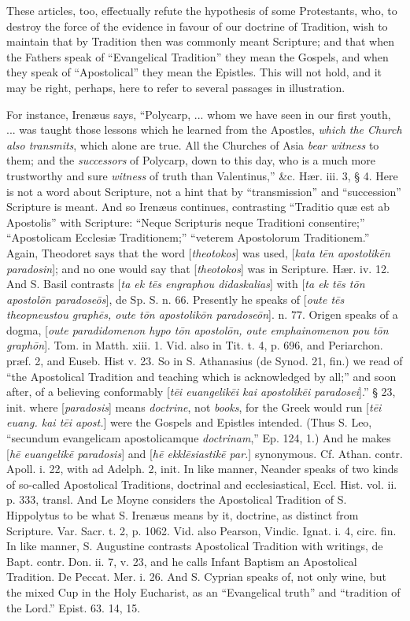 These articles, too, effectually refute the
hypothesis of some Protestants, who, to destroy the force of the
evidence in favour of our doctrine of Tradition, wish to maintain that
by Tradition then was commonly meant Scripture; and that when the
Fathers speak of ``Evangelical Tradition'' they mean the Gospels, and
when they speak of ``Apostolical'' they mean the Epistles. This will not
hold, and it may be right, perhaps, here to refer to several passages
in illustration.

For instance, Irenæus says, ``Polycarp, ... whom
we have seen in our first youth, ... was taught those lessons which he
learned from the Apostles, \emph{which the Church also transmits},
which alone are true. All the Churches of Asia \emph{bear witness} to
them; and the \emph{successors} of Polycarp, down to this day, who is
a much more trustworthy and sure \emph{witness} of truth than
Valentinus,'' \&c. Hær. iii. 3, § 4. Here is not a word about
Scripture, not a hint that by ``transmission'' and ``succession''
Scripture is meant. And so Irenæus continues, contrasting ``Traditio
quæ est ab Apostolis'' with Scripture: ``Neque Scripturis neque
Traditioni consentire;'' ``Apostolicam Ecclesiæ Traditionem;'' ``veterem
Apostolorum Traditionem.'' Again, Theodoret says that the word [\emph{theotokos}]
was used, [\emph{kata t\={e}n apostolik\={e}n paradosin}]; and
no one would say that [\emph{theotokos}] was in Scripture. Hær. iv.
12. And S. Basil contrasts [\emph{ta ek t\={e}s engraphou didaskalias}]
with [\emph{ta ek t\={e}s t\={o}n apostol\={o}n paradose\={o}s}],
de Sp. S. n. 66. Presently he speaks of [\emph{oute t\={e}s
theopneustou graph\={e}s, oute t\={o}n apostolik\={o}n
paradose\={o}n}]. n. 77. Origen speaks of a dogma, [\emph{oute
paradidomenon hypo t\={o}n apostol\={o}n, oute emphainomenon pou
t\={o}n graph\={o}n}]. Tom. in Matth. xiii. 1. Vid. also in
Tit. t. 4, p. 696, and Periarchon. præf. 2, and Euseb. Hist v. 23. So
in S. Athanasius (de Synod. 21, fin.) we read of ``the Apostolical
Tradition and teaching which is acknowledged by all;'' and soon after,
of a believing conformably [\emph{t\={e}i euangelik\={e}i kai
apostolik\={e}i paradosei}].'' § 23, init. where [\emph{paradosis}]
means \emph{doctrine}, not \emph{books}, for the Greek would run [\emph{t\={e}i
euang. kai t\={e}i apost.}] were the Gospels and Epistles
intended. (Thus S. Leo, ``secundum evangelicam apostolicamque \emph{doctrinam},''
Ep. 124, 1.) And he makes [\emph{h\={e} euangelik\={e} paradosis}]
and [\emph{h\={e} ekkl\={e}siastik\={e} par.}] synonymous.
Cf. Athan. contr. Apoll. i. 22, with ad Adelph. 2, init. In like
manner, Neander speaks of two kinds of so-called Apostolical
Traditions, doctrinal and ecclesiastical, Eccl. Hist. vol. ii. p. 333,
transl. And Le Moyne considers the Apostolical Tradition of S.
Hippolytus to be what S. Irenæus means by it, doctrine, as distinct
from Scripture. Var. Sacr. t. 2, p. 1062. Vid. also Pearson,
Vindic. Ignat. i. 4, circ. fin. In like manner, S. Augustine contrasts
Apostolical Tradition with writings, de Bapt. contr. Don. ii. 7, v.
23, and he calls Infant Baptism an Apostolical Tradition. De Peccat.
Mer. i. 26. And S. Cyprian speaks of, not only wine, but the mixed Cup
in the Holy Eucharist, as an ``Evangelical truth'' and ``tradition of the
Lord.'' Epist. 63. 14, 15.

